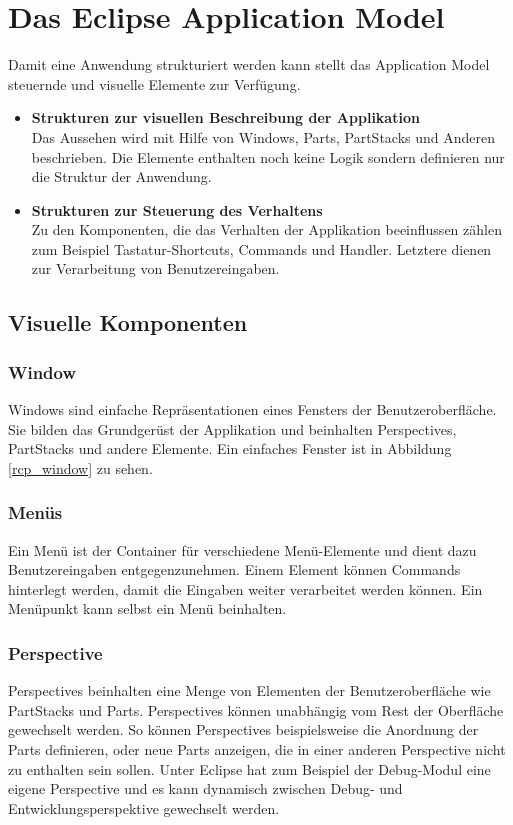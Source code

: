 \section{Das Eclipse Application Model}

Damit eine Anwendung strukturiert werden kann stellt das Application Model steuernde und visuelle Elemente zur Verfügung.
\begin{itemize}

\item \textbf{Strukturen zur visuellen Beschreibung der Applikation}\\
	Das Aussehen wird mit Hilfe von Windows, Parts, PartStacks und Anderen beschrieben. Die Elemente enthalten noch keine Logik sondern definieren nur die Struktur der Anwendung.


\item \textbf{Strukturen zur Steuerung des Verhaltens}\\
	 Zu den Komponenten, die das Verhalten der Applikation beeinflussen zählen zum Beispiel Tastatur-Shortcuts, Commands und Handler. Letztere dienen zur Verarbeitung von Benutzereingaben.

\end{itemize}

\subsection{Visuelle Komponenten}

\subsubsection{Window}
Windows sind einfache Repräsentationen eines Fensters der Benutzeroberfläche\cite[org.eclipse.e4.ui.model.application.ui.basic]{eclipse:help}. Sie bilden das Grundgerüst der Applikation und beinhalten Perspectives, PartStacks und andere Elemente. Ein einfaches Fenster ist in Abbildung \ref{rcp_window} zu sehen.

\subsubsection{Menüs}
Ein Menü ist der Container für verschiedene Menü-Elemente und dient dazu Benutzereingaben entgegenzunehmen. Einem Element können Commands hinterlegt werden, damit die Eingaben weiter verarbeitet werden können. Ein Menüpunkt kann selbst ein Menü beinhalten.

\subsubsection{Perspective}
Perspectives beinhalten eine Menge von Elementen der Benutzeroberfläche wie PartStacks und Parts. Perspectives können unabhängig vom Rest der Oberfläche gewechselt werden\cite[org.eclipse.e4.ui.model.application.ui.advanced]{eclipse:help}. So können Perspectives beispielsweise die Anordnung der Parts definieren, oder neue Parts anzeigen, die in einer anderen Perspective nicht zu enthalten sein sollen. Unter Eclipse hat zum Beispiel der Debug-Modul eine eigene Perspective und es kann dynamisch zwischen Debug- und Entwicklungsperspektive gewechselt werden.

